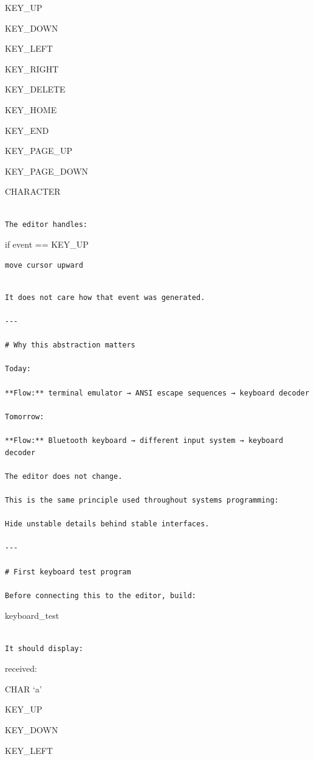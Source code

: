 \documentclass[
  oneside,
  openany]{book}
\begin{document}
KEY\_UP

KEY\_DOWN

KEY\_LEFT

KEY\_RIGHT

KEY\_DELETE

KEY\_HOME

KEY\_END

KEY\_PAGE\_UP

KEY\_PAGE\_DOWN

CHARACTER

\begin{verbatim}

The editor handles:
\end{verbatim}

if event == KEY\_UP

\begin{verbatim}
move cursor upward
\end{verbatim}

\begin{verbatim}

It does not care how that event was generated.

---

# Why this abstraction matters

Today:

**Flow:** terminal emulator → ANSI escape sequences → keyboard decoder

Tomorrow:

**Flow:** Bluetooth keyboard → different input system → keyboard decoder

The editor does not change.

This is the same principle used throughout systems programming:

Hide unstable details behind stable interfaces.

---

# First keyboard test program

Before connecting this to the editor, build:
\end{verbatim}

keyboard\_test

\begin{verbatim}

It should display:
\end{verbatim}

received:

CHAR `a'

KEY\_UP

KEY\_DOWN

KEY\_LEFT
\end{document}
